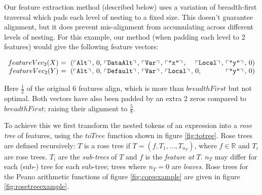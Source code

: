 Our feature extraction method (described below) uses a variation of breadth-first traversal which pads each level of nesting to a fixed size. This doesn't guarantee alignment, but it does prevent mis-alignment from accumulating across different levels of nesting. For this example, our method (when padding each level to 2 features) would give the following feature vectors:

\begin{small}
  \begin{equation*}
    \begin{array}{r@{}l@{}l@{}l@{}l@{}l@{}l@{}l@{}l@{}l}
      featureVec_2(X)\ &=\ (\feature{\CAlt},\ &0,\ &\feature{\CDataAlt},\ &\feature{\CVar},\ &\feature{\id{x}},\  &\feature{\CLocal},\ &\feature{\id{y}},\ &0 &) \\
      featureVec_2(Y)\ &=\ (\feature{\CAlt},\ &0,\ &\feature{\CDefault},\ &\feature{\CVar},\ &\feature{\CLocal},\ &0,\                 &\feature{\id{y}},\ &0 &)
    \end{array}
  \end{equation*}
\end{small}

Here $\frac{1}{2}$ of the original 6 features align, which is more than $breadthFirst$ but not optimal. Both vectors have also been padded by an extra 2 zeros compared to $breadthFirst$; raising their alignment to $\frac{5}{8}$.

To achieve this we first transform the nested tokens of an expression into a \emph{rose tree} of features, using the $toTree$ function shown in figure \ref{fig:totree}. Rose trees are defined recursively: $T$ is a rose tree if $T = (f, T_1, \dots, T_{n_T})$, where $f \in \mathbb{R}$ and $T_i$ are rose trees. $T_i$ are the \emph{sub-trees} of $T$ and $f$ is the \emph{feature at} $T$. $n_T$ may differ for each (sub-) tree for each sub-tree; trees where $n_T = 0$ are \emph{leaves}. Rose trees for the Peano arithmetic functions of figure \ref{fig:coreexample} are given in figure \ref{fig:rosetreeexample}.

